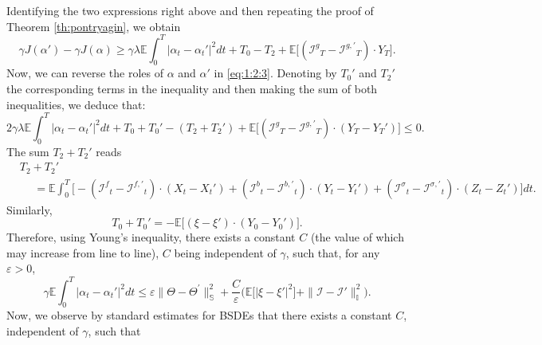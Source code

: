 \documentclass[11pt]{amsart}
\begin{document}
Identifying the two expressions right above and then repeating the proof of Theorem \ref{th:pontryagin}, we obtain
\begin{equation}
\label{eq:1:2:3}
\gamma J(\alpha') - \gamma J(\alpha) \geq 
\gamma \lambda {\mathbb E} \int_{0}^T \vert \alpha_{t} - \alpha_{t}' \vert^2 dt + 
T_{0} - T_{2} + {\mathbb E} \bigl[({{\mathcal I}^g}_T-{{\mathcal I}^{g,\prime}}_T)\cdot Y_T \bigr]. 
\end{equation}
Now, we can reverse the roles of $\alpha$ and $\alpha'$ in \eqref{eq:1:2:3}. Denoting by $T_{0}'$ and $T_{2}'$ the 
corresponding terms in the inequality and then making the sum of both inequalities, we deduce that:
\begin{equation*}
2 \gamma \lambda {\mathbb E} \int_{0}^T \vert \alpha_{t} - \alpha_{t}' \vert^2 dt
 + T_{0} + T_{0}' - (T_{2} + T_{2}') + {\mathbb E} \bigl[({{\mathcal I}^g}_T-{{\mathcal I}^{g,\prime}}_T)\cdot (Y_T-Y_{T}') \bigr] \leq 0.  
\end{equation*}
The sum $T_{2}+T_{2}'$ reads
\begin{equation*}
\begin{split}
&T_{2} + T_{2}' 
\\
&\hspace{15pt}= 
 {\mathbb E} \int_0^T \bigl[
- ({{\mathcal I}^f}_{t}-{{\mathcal I}^{f,\prime}}_{t}
)\cdot (X_{t} - X_{t}')
+  
({{\mathcal I}^b}_{t} - {{\mathcal I}^{b,\prime}}_{t} )
\cdot (Y_{t}  - Y_{t}' ) 
 + ({{\mathcal I}^{\sigma}}_{t} - {{\mathcal I}^{\sigma,\prime}}_{t} )
 \cdot  (Z_t-Z_{t}') \bigr] dt.
\end{split}
\end{equation*}
Similarly,
\begin{equation*}
T_{0} + T_{0}' = - {\mathbb E} \bigl[ (\xi - \xi') \cdot (Y_{0} - Y_{0}') \bigr]. 
\end{equation*}
Therefore, using Young's inequality, there exists a constant $C$ (the value of which may increase from line to line), $C$ being independent of $\gamma$, such that, for any $\varepsilon >0$,
\begin{equation}
\label{eq:2:2:3}
 \gamma {\mathbb E} \int_{0}^T \vert \alpha_{t} - \alpha_{t}' \vert^2 dt
 \leq 
 \varepsilon 
  \| \Theta - \Theta^{\prime} \|_{\mathbb S}^2 
+ \frac{C}{\varepsilon} \bigl( {\mathbb E} \bigl[ \vert \xi - \xi' \vert^2 \bigr] +
 \| {\mathcal I} - {\mathcal I}' \|_{\mathbb I}^2 \bigr).  
\end{equation}
Now, we observe by standard estimates for BSDEs that there exists a constant $C$, independent of $\gamma$, such that  
\end{document}
